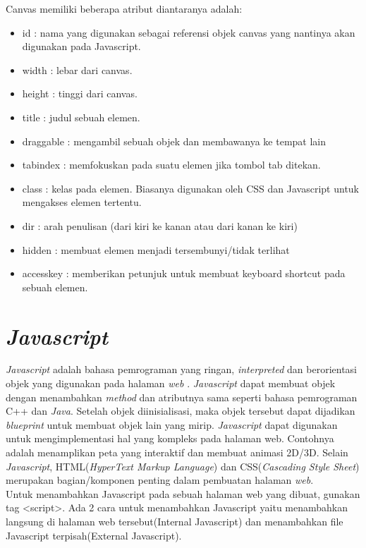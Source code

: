 Canvas memiliki beberapa atribut diantaranya adalah: 
\begin{itemize}
	\item id : nama yang digunakan sebagai referensi objek canvas yang nantinya akan digunakan pada Javascript.
	\item width : lebar dari canvas.
	\item height : tinggi dari canvas.
	\item title : judul sebuah elemen.
	\item draggable : mengambil sebuah objek dan membawanya ke tempat lain
	\item tabindex : memfokuskan pada suatu elemen jika tombol tab ditekan.
	\item class : kelas pada elemen. Biasanya digunakan oleh CSS dan Javascript untuk mengakses elemen tertentu.
	\item dir : arah penulisan (dari kiri ke kanan atau dari kanan ke kiri)
	\item hidden : membuat elemen menjadi tersembunyi/tidak terlihat
	\item accesskey : memberikan petunjuk untuk membuat keyboard shortcut pada sebuah elemen.
\end{itemize}


\section{\textit{Javascript}}
\label{sec:Javascript}
\textit{Javascript} adalah bahasa pemrograman yang ringan, \textit{interpreted} dan berorientasi objek yang digunakan pada halaman \textit{web} \cite{MDN:05:Web}. \textit{Javascript} dapat membuat objek dengan menambahkan \textit{method} dan atributnya sama seperti bahasa pemrograman C++ dan \textit{Java}. Setelah objek diinisialisasi, maka objek tersebut dapat dijadikan \textit{blueprint} untuk membuat objek lain yang mirip. \textit{Javascript} dapat digunakan untuk mengimplementasi hal yang kompleks pada halaman web. Contohnya adalah menamplikan peta yang interaktif dan membuat animasi 2D/3D. Selain \textit{Javascript}, HTML(\textit{HyperText Markup Language}) dan CSS(\textit{Cascading Style Sheet}) merupakan bagian/komponen penting dalam pembuatan halaman \textit{web}.\\

Untuk menambahkan Javascript pada sebuah halaman web yang dibuat, gunakan tag <script>. Ada 2 cara untuk menambahkan Javascript yaitu menambahkan langsung di halaman web tersebut(Internal Javascript) dan menambahkan file Javascript terpisah(External Javascript).

